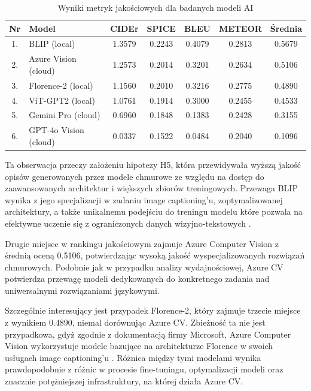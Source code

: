 \begin{table}[!h] \centering
\caption{Wyniki metryk jakościowych dla badanych modeli AI}
\begin{tabular}{|c|l|c|c|c|c|c|} \hline
\label{tab:jakosc_table_sr}
\textbf{Nr} & \textbf{Model} & \textbf{CIDEr} & \textbf{SPICE} & \textbf{BLEU} & \textbf{METEOR} & \textbf{Średnia} \\ \hline\hline
1. & BLIP (local)           & 1.3579 & 0.2243 & 0.4079 & 0.2813 & 0.5679 \\ \hline
2. & Azure Vision (cloud)   & 1.2573 & 0.2014 & 0.3201 & 0.2634 & 0.5106 \\ \hline
3. & Florence-2 (local)     & 1.1560 & 0.2010 & 0.3216 & 0.2775 & 0.4890 \\ \hline
4. & ViT-GPT2 (local)       & 1.0761 & 0.1914 & 0.3000 & 0.2455 & 0.4533 \\ \hline
5. & Gemini Pro (cloud)     & 0.6960 & 0.1848 & 0.1383 & 0.2428 & 0.3155 \\ \hline
6. & GPT-4o Vision (cloud)  & 0.0337 & 0.1522 & 0.0484 & 0.2040 & 0.1096 \\ \hline
\end{tabular}
\end{table}

Ta obserwacja przeczy założeniu hipotezy H5, która przewidywała wyższą jakość opisów generowanych przez modele chmurowe
ze względu na dostęp do zaawansowanych architektur i większych zbiorów treningowych. Przewaga BLIP wynika z jego specjalizacji
w zadaniu image captioning'u, zoptymalizowanej architektury, a także unikalnemu podejściu do treningu modelu które pozwala na efektywne uczenie się
z ograniczonych danych wizyjno-tekstowych \cite{blip_li2022}.

Drugie miejsce w rankingu jakościowym zajmuje Azure Computer Vision z średnią oceną 0.5106, potwierdzając wysoką jakość
wyspecjalizowanych rozwiązań chmurowych. Podobnie jak w przypadku analizy wydajnościowej, Azure CV potwierdza przewagę
modeli dedykowanych do konkretnego zadania nad uniwersalnymi rozwiązaniami językowymi.

Szczególnie interesujący jest przypadek Florence-2, który zajmuje trzecie miejsce z wynikiem 0.4890, niemal dorównując Azure CV.
Zbieżność ta nie jest przypadkowa, gdyż zgodnie z dokumentacją firmy Microsoft, Azure Computer Vision wykorzystuje modele bazujące na architekturze Florence
w swoich usługach image captioning'u \cite{azurecv_florence}. Różnica między tymi modelami wynika prawdopodobnie
z różnic w procesie fine-tuningu, optymalizacji modeli oraz znacznie potężniejszej infrastruktury, na której działa Azure CV.


